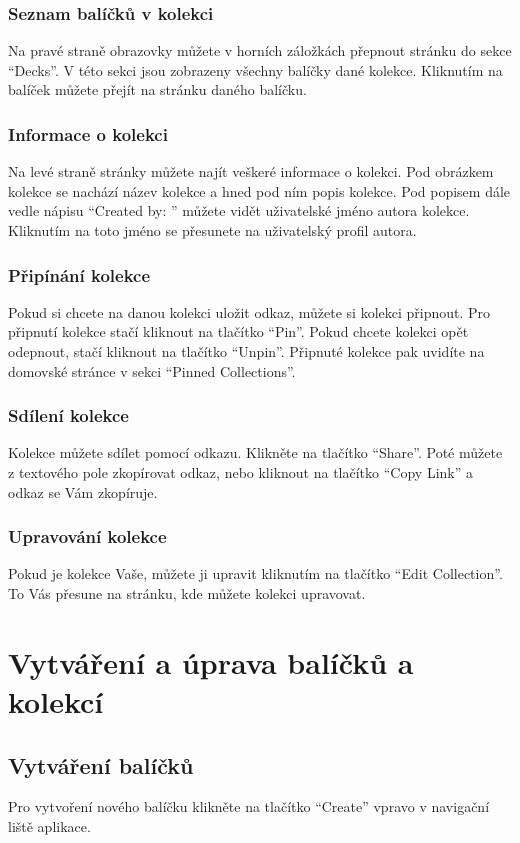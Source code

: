 \documentclass[a4paper,12pt]{article}
\begin{document}
\subsubsection*{Seznam balíčků v kolekci}
Na pravé straně obrazovky můžete v horních záložkách přepnout stránku do sekce \enquote{Decks}. V této sekci jsou zobrazeny všechny balíčky dané kolekce. Kliknutím na balíček můžete přejít na stránku daného balíčku.

\subsubsection*{Informace o kolekci}
Na levé straně stránky můžete najít veškeré informace o kolekci. Pod obrázkem kolekce se nachází název kolekce a hned pod ním popis kolekce. Pod popisem dále vedle nápisu \enquote{Created by: } můžete vidět uživatelské jméno autora kolekce. Kliknutím na toto jméno se přesunete na uživatelský profil autora.

\subsubsection*{Připínání kolekce}
Pokud si chcete na danou kolekci uložit odkaz, můžete si kolekci připnout. Pro připnutí kolekce stačí kliknout na tlačítko \enquote{Pin}. Pokud chcete kolekci opět odepnout, stačí kliknout na tlačítko \enquote{Unpin}. Připnuté kolekce pak uvidíte na domovské stránce v sekci \enquote{Pinned Collections}.

\subsubsection*{Sdílení kolekce}
Kolekce můžete sdílet pomocí odkazu. Klikněte na tlačítko \enquote{Share}. Poté můžete z textového pole zkopírovat odkaz, nebo kliknout na tlačítko \enquote{Copy Link} a odkaz se Vám zkopíruje.

\subsubsection*{Upravování kolekce}
Pokud je kolekce Vaše, můžete ji upravit kliknutím na tlačítko \enquote{Edit Collection}. To Vás přesune na stránku, kde můžete kolekci upravovat.

\section{Vytváření a úprava balíčků a kolekcí}
\subsection{Vytváření balíčků}
Pro vytvoření nového balíčku klikněte na tlačítko \enquote{Create} vpravo v navigační liště aplikace.
\end{document}
